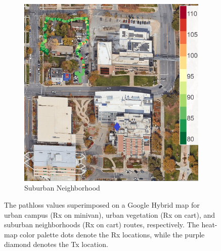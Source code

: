 \documentclass[12pt, draftcls, onecolumn]{IEEEtran}
\begin{document}
\begin{figure} [t]
\begin{subfigure}{0.245\linewidth}
         \centering
         \includegraphics[width=1.0\linewidth]{figs/pl_suburban_fraternities.jpg}
         \caption{Suburban Neighborhood}
         \label{F6c}
     \end{subfigure}
     \vspace{-2mm}
     \caption{The pathloss values superimposed on a Google Hybrid map for urban campus (Rx on minivan), urban vegetation (Rx on cart), and suburban neighborhoods (Rx on cart) routes, respectively. The heat-map color palette dots denote the Rx locations, while the purple diamond denotes the Tx location.}
     \label{F6}
\end{figure}
\end{document}
